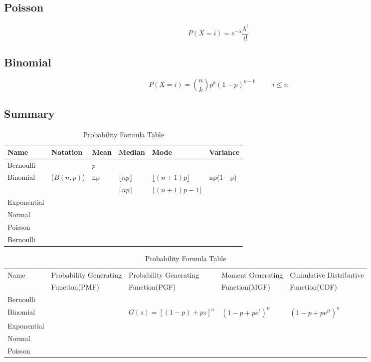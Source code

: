 \documentclass[a4paper,oneside]{book}
\begin{document}
\subsection{Poisson}
$$ P(X = i) = e^{-\lambda} \frac{\lambda^{i}}{i!}$$
\subsection{Binomial}
$$ P(X = i) = {n \choose k} p^{k}(1 - p)^{n-k} \hspace{1cm} i \leq n$$
\subsection{Summary}
\begin{table}
    \centering
    \caption{Probability Formula Table}
    \begin{tabular}[H]{|p{2cm}|p{2cm}|p{3cm}|p{4cm}|p{5cm}|p{4cm}|}
\hline
Name & Notation &Mean & Median & Mode & Variance \\ \hline
Bernoulli & & $p$ & & & \\ \hline
\multirow{2}{*}{Binomial} & \multirow{2}{*}{($B(n,p)$)}  & \multirow{2}{*}{np} & $\lfloor np \rfloor$  & $\lfloor (n+1)p\rfloor$  & np(1 - p) \\ \cline{4-6}
&  & & $\lceil np \rceil$ & $\lfloor(n+1)p-1\rfloor$ &    \\ \hline
Exponential & & & & & \\ \hline
Normal & & & & & \\ \hline
Poisson & & & & & \\ \hline
Bernoulli & & & & & \\ \hline
\end{tabular}
\end{table}
\begin{table}
    \centering
    \caption{Probability Formula Table}
    \begin{tabular}[H]{|p{2.5cm}|p{4.5cm}|p{4.5cm}|p{4.5cm}|p{4.5cm}|}
    \hline
   \multirow{2}{*}{Name} & Probability Generating & Probability Generating  & Moment Generating  & Cumulative Distributive  \\ 
   &  Function(PMF) & Function(PGF) & Function(MGF)& Function(CDF) \\ \hline 
Bernoulli & & & & \\ \hline
Binomial & & $G(z) = \left[(1 - p) + pz\right]^{n}$& $(1 - p + pe^{t})^{n}
$ & $(1 - p + pe^{it})^{n}
$\\ \hline
Exponential & & & & \\ \hline
Normal & & & & \\ \hline
Poisson & & & & \\ \hline
\end{tabular}
\end{table}
\end{document}
